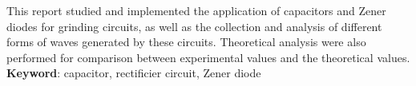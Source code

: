  \setlength{\absparsep}{18pt} %
\begin{resumo}[Abstract]
This report studied and implemented the application of capacitors and Zener diodes for grinding circuits, as well as the collection and analysis of different forms of waves generated by these circuits. Theoretical analysis were also performed for comparison between experimental values and the theoretical values. \\
 \noindent
 \textbf{Keyword}: capacitor, rectificier circuit, Zener diode
 \end{resumo} 